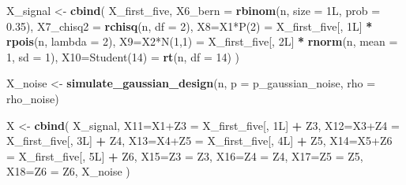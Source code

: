 \documentclass[
]{article}
\newenvironment{Shaded}{\begin{snugshade}}{\end{snugshade}}
\newcommand{\AttributeTok}[1]{\textcolor[rgb]{0.13,0.29,0.53}{#1}}
\newcommand{\DataTypeTok}[1]{\textcolor[rgb]{0.13,0.29,0.53}{#1}}
\newcommand{\DecValTok}[1]{\textcolor[rgb]{0.00,0.00,0.81}{#1}}
\newcommand{\FloatTok}[1]{\textcolor[rgb]{0.00,0.00,0.81}{#1}}
\newcommand{\FunctionTok}[1]{\textcolor[rgb]{0.13,0.29,0.53}{\textbf{#1}}}
\newcommand{\NormalTok}[1]{#1}
\newcommand{\OtherTok}[1]{\textcolor[rgb]{0.56,0.35,0.01}{#1}}
\newcommand{\SpecialCharTok}[1]{\textcolor[rgb]{0.81,0.36,0.00}{\textbf{#1}}}
\newcommand{\StringTok}[1]{\textcolor[rgb]{0.31,0.60,0.02}{#1}}
\begin{document}
\begin{Shaded}
\begin{Highlighting}[]
\NormalTok{  X\_signal }\OtherTok{\textless{}{-}} \FunctionTok{cbind}\NormalTok{(}
\NormalTok{    X\_first\_five,}
    \AttributeTok{X6\_bern =} \FunctionTok{rbinom}\NormalTok{(n, }\AttributeTok{size =} \DecValTok{1}\DataTypeTok{L}\NormalTok{, }\AttributeTok{prob =} \FloatTok{0.35}\NormalTok{),}
    \AttributeTok{X7\_chisq2 =} \FunctionTok{rchisq}\NormalTok{(n, }\AttributeTok{df =} \DecValTok{2}\NormalTok{),}
    \StringTok{\textasciigrave{}}\AttributeTok{X8=X1*P(2)}\StringTok{\textasciigrave{}} \OtherTok{=}\NormalTok{ X\_first\_five[, }\DecValTok{1}\DataTypeTok{L}\NormalTok{] }\SpecialCharTok{*} \FunctionTok{rpois}\NormalTok{(n, }\AttributeTok{lambda =} \DecValTok{2}\NormalTok{),}
    \StringTok{\textasciigrave{}}\AttributeTok{X9=X2*N(1,1)}\StringTok{\textasciigrave{}} \OtherTok{=}\NormalTok{ X\_first\_five[, }\DecValTok{2}\DataTypeTok{L}\NormalTok{] }\SpecialCharTok{*} \FunctionTok{rnorm}\NormalTok{(n, }\AttributeTok{mean =} \DecValTok{1}\NormalTok{, }\AttributeTok{sd =} \DecValTok{1}\NormalTok{),}
    \StringTok{\textasciigrave{}}\AttributeTok{X10=Student(14)}\StringTok{\textasciigrave{}} \OtherTok{=} \FunctionTok{rt}\NormalTok{(n, }\AttributeTok{df =} \DecValTok{14}\NormalTok{)}
\NormalTok{  )}

\NormalTok{  X\_noise }\OtherTok{\textless{}{-}} \FunctionTok{simulate\_gaussian\_design}\NormalTok{(n, }\AttributeTok{p =}\NormalTok{ p\_gaussian\_noise, }\AttributeTok{rho =}\NormalTok{ rho\_noise)}

\NormalTok{  X }\OtherTok{\textless{}{-}} \FunctionTok{cbind}\NormalTok{(}
\NormalTok{    X\_signal,}
    \StringTok{\textasciigrave{}}\AttributeTok{X11=X1+Z3}\StringTok{\textasciigrave{}} \OtherTok{=}\NormalTok{ X\_first\_five[, }\DecValTok{1}\DataTypeTok{L}\NormalTok{] }\SpecialCharTok{+}\NormalTok{ Z3,}
    \StringTok{\textasciigrave{}}\AttributeTok{X12=X3+Z4}\StringTok{\textasciigrave{}} \OtherTok{=}\NormalTok{ X\_first\_five[, }\DecValTok{3}\DataTypeTok{L}\NormalTok{] }\SpecialCharTok{+}\NormalTok{ Z4,}
    \StringTok{\textasciigrave{}}\AttributeTok{X13=X4+Z5}\StringTok{\textasciigrave{}} \OtherTok{=}\NormalTok{ X\_first\_five[, }\DecValTok{4}\DataTypeTok{L}\NormalTok{] }\SpecialCharTok{+}\NormalTok{ Z5,}
    \StringTok{\textasciigrave{}}\AttributeTok{X14=X5+Z6}\StringTok{\textasciigrave{}} \OtherTok{=}\NormalTok{ X\_first\_five[, }\DecValTok{5}\DataTypeTok{L}\NormalTok{] }\SpecialCharTok{+}\NormalTok{ Z6,}
    \StringTok{\textasciigrave{}}\AttributeTok{X15=Z3}\StringTok{\textasciigrave{}} \OtherTok{=}\NormalTok{ Z3,}
    \StringTok{\textasciigrave{}}\AttributeTok{X16=Z4}\StringTok{\textasciigrave{}} \OtherTok{=}\NormalTok{ Z4,}
    \StringTok{\textasciigrave{}}\AttributeTok{X17=Z5}\StringTok{\textasciigrave{}} \OtherTok{=}\NormalTok{ Z5,}
    \StringTok{\textasciigrave{}}\AttributeTok{X18=Z6}\StringTok{\textasciigrave{}} \OtherTok{=}\NormalTok{ Z6,}
\NormalTok{    X\_noise}
\NormalTok{  )}


\end{Highlighting}
\end{Shaded}
\end{document}
